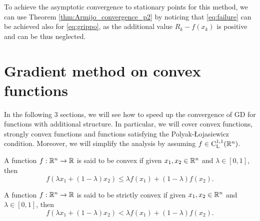 \documentclass[10pt,a4paper]{article}
\begin{document}
To achieve the asymptotic convergence to stationary points for this method, we can use Theorem \ref{thm:Armijo_convergence_p2} by noticing that \eqref{eq:failure} can be achieved also for \eqref{eq:grippo}, as the additional value $R_k-f(x_k)$ is positive and can be thus neglected.

\section{Gradient method on convex functions}
In the following 3 sections, we will see how to speed up the convergence of GD for functions with additional structure. In particular, we will cover convex functions, strongly convex functions and functions satisfying the Polyak-\L ojasiewicz condition. Moreover, we will simplify the analysis by assuming $f\in \mathord{\mathrm{C^{1,1}_{L}}}(\mathbb{R}^n)$.
\begin{definition}
	A function $f:\mathbb{R}^n\to \mathbb{R}$ is said to be convex if given $x_1,x_2\in \mathbb{R}^n$ and $\lambda\in [0,1]$, then 
	\begin{equation*}
		f(\lambda x_1 +(1-\lambda) x_2) \leq \lambda f(x_1) +(1-\lambda) f(x_2).
	\end{equation*}
\end{definition}
\begin{definition}
	A function $f:\mathbb{R}^n\to \mathbb{R}$ is said to be strictly convex if given $x_1,x_2\in \mathbb{R}^n$ and $\lambda\in [0,1]$, then 
	\begin{equation*}
		f(\lambda x_1 +(1-\lambda) x_2) < \lambda f(x_1) +(1-\lambda) f(x_2).
	\end{equation*}
\end{definition}
\end{document}
